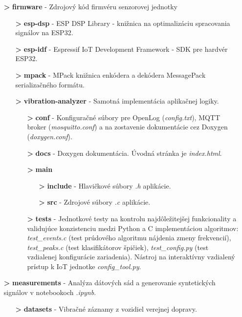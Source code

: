 \begin{itemize}[noitemsep]
\item[\textbf{>}] \textbf{firmware} - Zdrojový kód firmvéru senzorovej jednotky
	\begin{itemize}
	\item[\textbf{>}] \textbf{esp-dsp} - ESP DSP Library - knižnica na optimalizáciu spracovania signálov na ESP32.
	\item[\textbf{>}] \textbf{esp-idf} - Espressif IoT Development Framework - SDK pre hardvér ESP32.
	\item[\textbf{>}] \textbf{mpack} - MPack knižnica enkódera a dekódera MessagePack serializačného formátu.
	\item[\textbf{>}] \textbf{vibration-analyzer} - Samotná implementácia aplikačnej logiky.
		\begin{itemize}
		\item[\textbf{>}] \textbf{conf} - Konfiguračné súbory pre OpenLog (\emph{config.txt}), MQTT broker  (\emph{mosquitto.conf})
		a na zostavenie dokumentácie cez Doxygen (\emph{doxygen.conf}).
		\item[\textbf{>}] \textbf{docs} - Doxygen dokumentácia. Úvodná stránka je \emph{index.html}.
		\item[\textbf{>}] \textbf{main}
			\begin{itemize}
			\item[\textbf{>}] \textbf{include} - Hlavičkové súbory \emph{.h} aplikácie.
			\item[\textbf{>}] \textbf{src} - Zdrojové súbory \emph{.c} aplikácie.
			\end{itemize}
		\item[\textbf{>}] \textbf{tests} - Jednotkové testy na kontrolu najdôležitejšej funkcionality a validujúce konzistenciu
		medzi Python a C implementáciou algoritmov: \emph{test\_events.c} (test prúdového algoritmu nájdenia zmeny frekvencií),
		\emph{test\_peaks.c} (test klasifikátorov špičiek), \emph{test\_config.py} (test vzdialenej konfigurácie zariadenia).
		Nástroj na interaktívny vzdialený prístup k IoT jednotke \emph{config\_tool.py}.
		\end{itemize}
	\end{itemize}
\item[\textbf{>}] \textbf{measurements} - Analýza dátových sád a generovanie syntetických signálov v notebookoch \emph{.ipynb}.
	\begin{itemize}
	\item[\textbf{>}] \textbf{datasets} - Vibračné záznamy z vozidiel verejnej dopravy.

\end{itemize}
\end{itemize}
